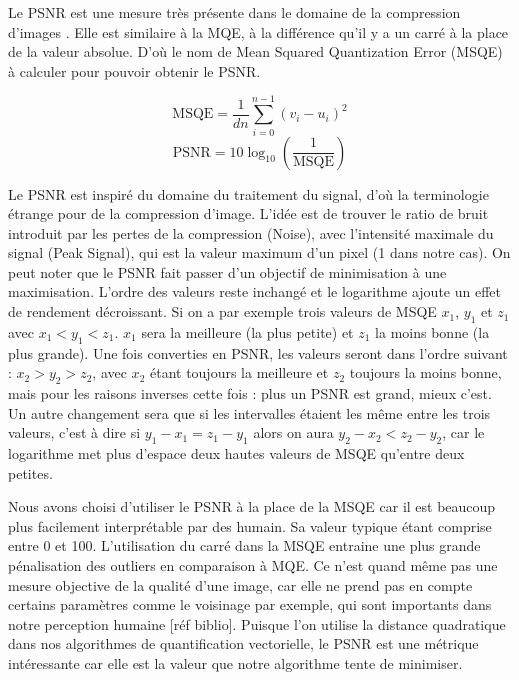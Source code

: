 	Le PSNR est une mesure très présente dans le domaine de la compression d'images \cite{huynh-psnr, korhonen-psnr}. Elle est similaire à la MQE, à la différence qu'il y a un carré à la place de la valeur absolue. D'où le nom de Mean Squared Quantization Error (MSQE) à calculer pour pouvoir obtenir le PSNR.
	
	\begin{equation}
		\text{MSQE} = \frac{1}{dn} \sum_{i=0}^{n-1} (v_i - u_i)^2
	\end{equation}
	\begin{equation}
		\text{PSNR} = 10 \log_{10} (\frac{1}{\text{MSQE}})
	\end{equation}

	Le PSNR est inspiré du domaine du traitement du signal, d'où la terminologie étrange pour de la compression d'image. L'idée est de trouver le ratio de bruit introduit par les pertes de la compression (Noise), avec l'intensité maximale du signal (Peak Signal), qui est la valeur maximum d'un pixel (1 dans notre cas). On peut noter que le PSNR fait passer d'un objectif de minimisation à une maximisation. L'ordre des valeurs reste inchangé et le logarithme ajoute un effet de rendement décroissant. Si on a par exemple trois valeurs de MSQE $x_1$, $y_1$ et $z_1$ avec $x_1 < y_1 < z_1$. $x_1$ sera la meilleure (la plus petite) et $z_1$ la moins bonne (la plus grande). Une fois converties en PSNR, les valeurs seront dans l'ordre suivant : $x_2 > y_2 > z_2$, avec $x_2$ étant toujours la meilleure et $z_2$ toujours la moins bonne, mais pour les raisons inverses cette fois : plus un PSNR est grand, mieux c'est. Un autre changement sera que si les intervalles étaient les même entre les trois valeurs, c'est à dire si $y_1 - x_1 = z_1 - y_1$ alors on aura $y_2 - x_2 < z_2 - y_2$, car le logarithme met plus d'espace deux hautes valeurs de MSQE qu'entre deux petites.

	Nous avons choisi d'utiliser le PSNR à la place de la MSQE car il est beaucoup plus facilement interprétable par des humain. Sa valeur typique étant comprise entre 0 et 100. L'utilisation du carré dans la MSQE entraine une plus grande pénalisation des outliers en comparaison à MQE. Ce n'est quand même pas une mesure objective de la qualité d'une image, car elle ne prend pas en compte certains paramètres comme le voisinage par exemple, qui sont importants dans notre perception humaine [réf biblio]. Puisque l'on utilise la distance quadratique dans nos algorithmes de quantification vectorielle, le PSNR est une métrique intéressante car elle est la valeur que notre algorithme tente de minimiser.
	
